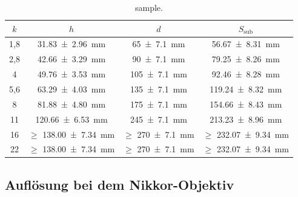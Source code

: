 		\begin{table}[ht]
			\centering
			\begin{tabular}{c|c|c|c}
				$k$ & $h$ & $d$ & $S_\text{sub}$\\
				\hline
				1,8 & \SI{31,83+-2,96}{\milli\meter} & \SI{65+-7,1}{\milli\meter} & \SI{56,67+-8,31}{\milli\meter}\\
				2,8 & \SI{42,66+-3,29}{\milli\meter} & \SI{90+-7,1}{\milli\meter} & \SI{79,25+-8,26}{\milli\meter}\\
				4 & \SI{49,76+-3,53}{\milli\meter} & \SI{105+-7,1}{\milli\meter} & \SI{92,46+-8,28}{\milli\meter}\\
				5,6 & \SI{63,29+-4,03}{\milli\meter} & \SI{135+-7,1}{\milli\meter} & \SI{119,24+-8,32}{\milli\meter}\\
				8 & \SI{81,88+-4,80}{\milli\meter} & \SI{175+-7,1}{\milli\meter} & \SI{154,66+-8,43}{\milli\meter} \\
				11 & \SI{120,66+-6,53}{\milli\meter} & \SI{245+-7,1}{\milli\meter} & \SI{213,23+-8,96}{\milli\meter}\\
				16 & $\geq$ \SI{138,00+-7,34}{\milli\meter} & $\geq$ \SI{270+-7,1}{\milli\meter} & $\geq$ \SI{232,07+-9,34}{\milli\meter}\\
				22 & $\geq$ \SI{138,00+-7,34}{\milli\meter} & $\geq$ \SI{270+-7,1}{\milli\meter} & $\geq$ \SI{232,07+-9,34}{\milli\meter}\\
			\end{tabular}
			\caption{sample.}
			\label{tab:Schärfentiefe_subj}
		\end{table}		
		
	\subsection{Auflösung bei dem Nikkor-Objektiv}
		
